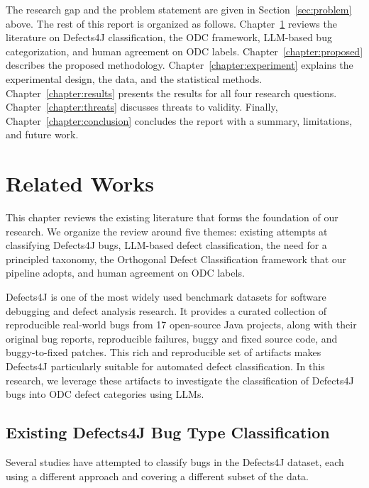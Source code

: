 \documentclass{iutbscthesis}
\begin{document}
The research gap and the problem statement are given in Section~\ref{sec:problem} above. The rest of this report is organized as follows. Chapter~\ref{chapter:related} reviews the literature on Defects4J classification, the ODC framework, LLM-based bug categorization, and human agreement on ODC labels. Chapter~\ref{chapter:proposed} describes the proposed methodology. Chapter~\ref{chapter:experiment} explains the experimental design, the data, and the statistical methods. Chapter~\ref{chapter:results} presents the results for all four research questions. Chapter~\ref{chapter:threats} discusses threats to validity. Finally, Chapter~\ref{chapter:conclusion} concludes the report with a summary, limitations, and future work.


\chapter{Related Works} \label{chapter:related}

This chapter reviews the existing literature that forms the foundation of our research. We organize the review around five themes: existing attempts at classifying Defects4J bugs, LLM-based defect classification, the need for a principled taxonomy, the Orthogonal Defect Classification framework that our pipeline adopts, and human agreement on ODC labels.

Defects4J \cite{just2014defects4j} is one of the most widely used benchmark datasets for software debugging and defect analysis research. It provides a curated collection of reproducible real-world bugs from 17 open-source Java projects, along with their original bug reports, reproducible failures, buggy and fixed source code, and buggy-to-fixed patches. This rich and reproducible set of artifacts makes Defects4J particularly suitable for automated defect classification. In this research, we leverage these artifacts to investigate the classification of Defects4J bugs into ODC defect categories using LLMs.

\section{Existing Defects4J Bug Type Classification}

Several studies have attempted to classify bugs in the Defects4J dataset, each using a different approach and covering a different subset of the data.
\end{document}
